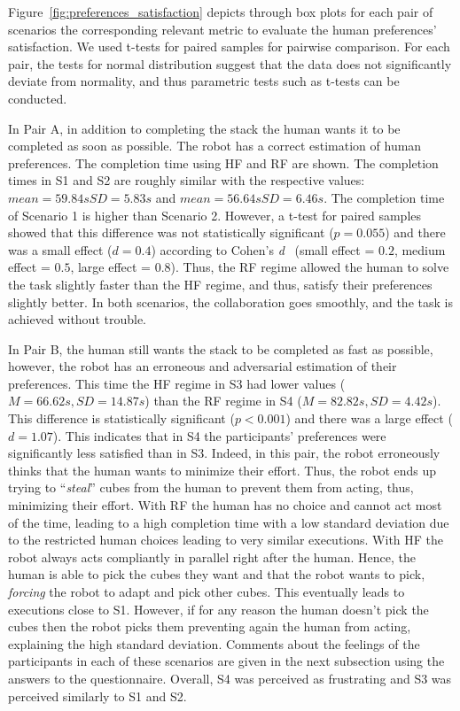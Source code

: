 Figure~\ref{fig:preferences_satisfaction} depicts through box plots for each pair of scenarios the corresponding relevant metric to evaluate the human preferences' satisfaction. We used t-tests for paired samples for pairwise comparison. For each pair, the tests for normal distribution suggest that the data does not significantly deviate from normality, and thus parametric tests such as t-tests can be conducted.

In Pair A, in addition to completing the stack the human wants it to be completed as soon as possible. The robot has a correct estimation of human preferences. The completion time using HF and RF are shown. The completion times in S1 and S2 are roughly similar with the respective values: $mean=59.84s SD=5.83s$ and $mean=56.64s SD=6.46s$. The completion time of Scenario 1 is higher than Scenario 2. However, a t-test for paired samples showed that this difference was not statistically significant ($p = 0.055$) and there was a small effect ($d = 0.4$) according to Cohen's \textit{d}~\cite{cohen1988concepts} (small effect = $0.2$, medium effect = $0.5$, large effect = $0.8$). Thus, the RF regime allowed the human to solve the task slightly faster than the HF regime, and thus, satisfy their preferences slightly better. 
In both scenarios, the collaboration goes smoothly, and the task is achieved without trouble.

In Pair B, the human still wants the stack to be completed as fast as possible, however, the robot has an erroneous and adversarial estimation of their preferences. This time the HF regime in S3 had lower values ($M=66.62s, SD=14.87s$) than the RF regime in S4 ($M=82.82s, SD=4.42s$). This difference is statistically significant ($p < 0.001$) and there was a large effect ($d = 1.07$). This indicates that in S4 the participants' preferences were significantly less satisfied than in S3. 
Indeed, in this pair, the robot erroneously thinks that the human wants to minimize their effort. Thus, the robot ends up trying to ``\textit{steal}'' cubes from the human to prevent them from acting, thus, minimizing their effort. With RF the human has no choice and cannot act most of the time, leading to a high completion time with a low standard deviation due to the restricted human choices leading to very similar executions. With HF the robot always acts compliantly in parallel right after the human. Hence, the human is able to pick the cubes they want and that the robot wants to pick, \textit{forcing} the robot to adapt and pick other cubes. This eventually leads to executions close to S1. However, if for any reason the human doesn't pick the cubes then the robot picks them preventing again the human from acting, explaining the high standard deviation. Comments about the feelings of the participants in each of these scenarios are given in the next subsection using the answers to the questionnaire. Overall, S4 was perceived as frustrating and S3 was perceived similarly to S1 and S2. 

